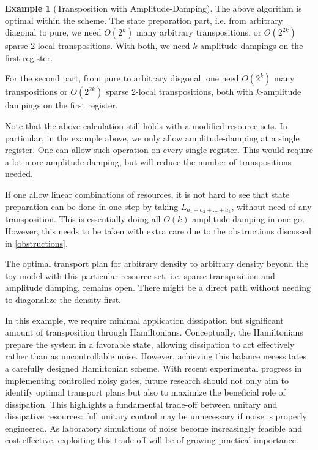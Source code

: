 \documentclass[11pt,reqno]{amsart}
\theoremstyle{definition}
\newtheorem{example}[theorem]{Example}
\begin{document}
\begin{example}[Transposition with Amplitude-Damping]
    The above algorithm is optimal within the scheme. The state preparation part, i.e. from arbitrary diagonal to pure, we need $O(2^k)$ many arbitrary transpositions, or $O(2^{2k})$ sparse 2-local transpositions. With both, we need $k$-amplitude dampings on the first register.
    
    For the second part, from pure to arbitrary disgonal, one need $O(2^k)$ many transpositions or $O(2^{2k})$ sparse 2-local transpositions, both with $k$-amplitude dampings on the first register.
\end{example}
Note that the above calculation still holds with a modified resource sets. In particular, in the example above, we only allow amplitude-damping at a single register. One can allow such operation on every single register. This would require a lot more amplitude damping, but will reduce the number of transpositions needed.

If one allow linear combinations of resources, it is not hard to see that state preparation can be done in one step by taking $L_{a_1+a_2+\dots+a_k}$, without need of any transposition. This is essentially doing all $O(k)$ amplitude damping in one go. However, this needs to be taken with extra care due to the obstructions discussed in \cref{obstructions}.

The optimal transport plan for arbitrary density to arbitrary density beyond the toy model with this particular resource set, i.e. sparse transposition and amplitude damping, remains open. There might be a direct path without needing to diagonalize the density first.

In this example, we require minimal application dissipation but significant amount of transposition through Hamiltonians. Conceptually, the Hamiltonians prepare the system in a favorable state, allowing dissipation to act effectively rather than as uncontrollable noise. However, achieving this balance necessitates a carefully designed Hamiltonian scheme. With recent experimental progress in implementing controlled noisy gates, future research should not only aim to identify optimal transport plans but also to maximize the beneficial role of dissipation. This highlights a fundamental trade-off between unitary and dissipative resources: full unitary control may be unnecessary if noise is properly engineered. As laboratory simulations of noise become increasingly feasible and cost-effective, exploiting this trade-off will be of growing practical importance.




\bigbreak
\end{document}
